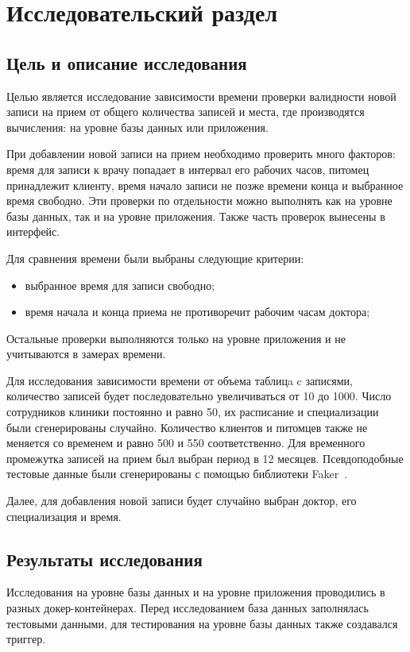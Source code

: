 \section{Исследовательский раздел}

\subsection{Цель и описание исследования}

Целью является исследование зависимости времени проверки валидности новой записи на прием от общего количества записей и места, где производятся вычисления: на уровне базы данных или приложения. 

При добавлении новой записи на прием необходимо проверить много факторов: время для записи к врачу попадает в интервал его рабочих часов, питомец принадлежит клиенту, время начало записи не позже времени конца и выбранное время свободно. Эти проверки по отдельности можно выполнять как на уровне базы данных, так и на уровне приложения. Также часть проверок вынесены в интерфейс.

Для сравнения времени были выбраны следующие критерии:
\begin{itemize}[label*=---]
	\item выбранное время для записи свободно;
	\item время начала и конца приема не противоречит рабочим часам доктора;
\end{itemize}

Остальные проверки выполняются только на уровне приложения и не учитываются в замерах времени.  

Для исследования зависимости времени от объема таблицa c записями, количество записей будет последовательно увеличиваться от 10 до 1000. Число сотрудников клиники постоянно и равно 50, их расписание и специализации были сгенерированы случайно. Количество клиентов и питомцев также не меняется со временем и равно 500 и 550 соответственно. Для временного промежутка записей на прием был выбран период в 12 месяцев. Псевдоподобные тестовые данные были сгенерированы с помощью библиотеки Faker~\cite{faker}.

Далее, для добавления новой записи будет случайно выбран доктор, его специализация и время.  

\subsection{Результаты исследования}
Исследования на уровне базы данных и на уровне приложения проводились в разных докер-контейнерах. Перед исследованием база данных заполнялась тестовыми данными, для тестирования на уровне базы данных также создавался триггер.

